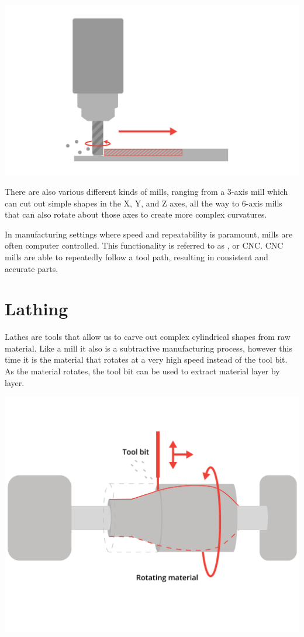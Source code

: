 \includegraphics[width=.75\textwidth]{mill1.png}


There are also various different kinds of mills, ranging from a 3-axis mill which can cut out simple shapes in the X, Y, and Z axes, all the way to 6-axis mills that can also rotate about those axes to create more complex curvatures.

In manufacturing settings where speed and repeatability is paramount, mills are often computer controlled. This functionality is referred to as , or CNC. CNC mills are able to repeatedly follow a tool path, resulting in consistent and accurate parts.

\section{Lathing}

Lathes are tools that allow us to carve out complex cylindrical shapes from raw material. Like a mill it also is a subtractive manufacturing process, however this time it is the material that rotates at a very high speed instead of the tool bit. As the material rotates, the tool bit can be used to extract material layer by layer. 

\includegraphics[width=.75\textwidth]{lathe.png}


